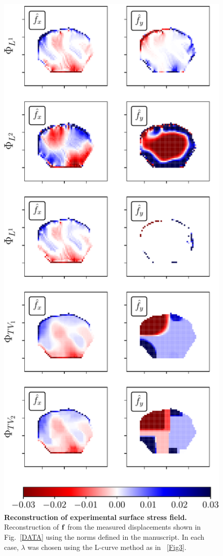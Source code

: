 \documentclass[aps,prl,reprint,twocolumn,groupedaddress,showpacs]{revtex4}
\def\f{{\bf f}}
\begin{document}
\begin{figure}
\includegraphics[width=\linewidth]{fig9}
\caption{\textbf{Reconstruction of experimental surface stress field.}
  Reconstruction of $\f$ from the measured displacements shown in
  Fig.~\ref{DATA} using the norms defined in the manuscript. In each 
  case, $\lambda$ was chosen using the L-curve method as in ~\ref{Fig3}.}
\label{DATA2}
\end{figure}
\end{document}
